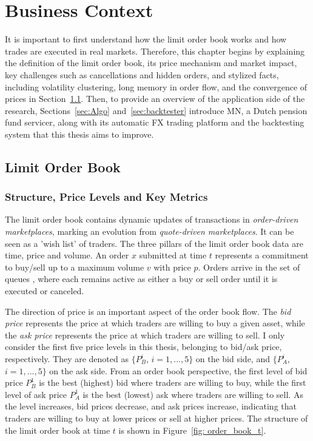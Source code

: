 \chapter{Business Context}\label{chapter:business}
It is important to first understand how the limit order book works and how trades are executed in real markets. Therefore, this chapter begins by explaining the definition of the limit order book, its price mechanism and market impact, key challenges such as cancellations and hidden orders, and stylized facts, including volatility clustering, long memory in order flow, and the convergence of prices in Section~\ref{sec:lob}. Then, to provide an overview of the application side of the research, Sections~\ref{sec:Algo} and~\ref{sec:backtester} introduce MN, a Dutch pension fund servicer, along with its automatic FX trading platform and the backtesting system that this thesis aims to improve.

\section{Limit Order Book} \label{sec:lob}
\subsection{Structure, Price Levels and Key Metrics}
The limit order book contains dynamic updates of transactions in \textit{order-driven marketplaces}, marking an evolution from \textit{quote-driven marketplaces}. It can be seen as a 'wish list' of traders. The three pillars of the limit order book data are time, price and volume. An order $x$ submitted at time $t$ represents a commitment to buy/sell up to a maximum volume $v$ with price $p$. Orders arrive in the set of queues \citep{gould_limit_2013}, where each remains active as either a buy or sell order until it is executed or canceled. 

The direction of price is an important aspect of the order book flow. The \textit{bid price} represents the price at which traders are willing to buy a given asset, while the \textit{ask price} represents the price at which traders are willing to sell. I only consider the first five price levels in this thesis, belonging to bid/ask price, respectively. They are denoted as $\{P_B ^ {i}$, $i = 1, \dots, 5\}$ on the bid side, and $\{P_A ^ {i}$, $i = 1, \dots, 5\}$ on the ask side. From an order book perspective, the first level of bid price $P_B^1$ is the best (highest) bid where traders are willing to buy, while the first level of ask price $P_A^1$ is the best (lowest) ask where traders are willing to sell. As the level increases, bid prices decrease, and ask prices increase, indicating that traders are willing to buy at lower prices or sell at higher prices. The structure of the limit order book at time $t$ is shown in Figure~\ref{fig: order_book_t}. 

